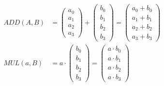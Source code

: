 \begin{align}
    \label{genx:eq:add_vec}
    ADD(A, B) &= \begin{pmatrix} a_0 \\ a_1 \\ a_2 \\ a_3 \end{pmatrix} +
    \begin{pmatrix} b_0 \\ b_1 \\ b_2 \\ b_3 \end{pmatrix} =
    \begin{pmatrix} a_0 + b_0 \\ a_1 + b_1 \\ a_2 + b_2 \\ a_3 + b_3 \end{pmatrix} \\
    \label{genx:eq:mul_scl_vec}
    MUL(a, B) &= a \cdot
    \begin{pmatrix} b_0 \\ b_1 \\ b_2 \\ b_3 \end{pmatrix} =
    \begin{pmatrix} a \cdot b_0 \\ a \cdot b_1 \\ a \cdot b_2 \\ a \cdot b_3 \end{pmatrix}
\end{align}

